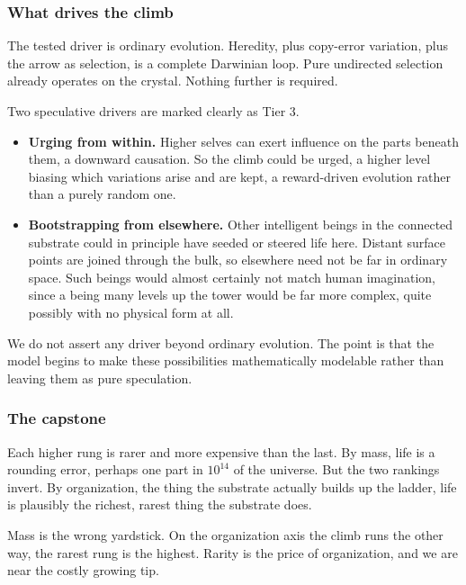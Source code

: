 \subsubsection{What drives the climb}

The tested driver is ordinary evolution. Heredity, plus copy-error variation, plus the arrow as selection, is a complete Darwinian loop. Pure undirected selection already operates on the crystal. Nothing further is required.

Two speculative drivers are marked clearly as Tier 3.

\begin{itemize}
\item \textbf{Urging from within.} Higher selves can exert influence on the parts beneath them, a downward causation. So the climb could be urged, a higher level biasing which variations arise and are kept, a reward-driven evolution rather than a purely random one.
\item \textbf{Bootstrapping from elsewhere.} Other intelligent beings in the connected substrate could in principle have seeded or steered life here. Distant surface points are joined through the bulk, so elsewhere need not be far in ordinary space. Such beings would almost certainly not match human imagination, since a being many levels up the tower would be far more complex, quite possibly with no physical form at all.
\end{itemize}

We do not assert any driver beyond ordinary evolution. The point is that the model begins to make these possibilities mathematically modelable rather than leaving them as pure speculation.

\subsubsection{The capstone}

Each higher rung is rarer and more expensive than the last. By mass, life is a rounding error, perhaps one part in $10^{14}$ of the universe. But the two rankings invert. By organization, the thing the substrate actually builds up the ladder, life is plausibly the richest, rarest thing the substrate does.

\begin{principle}
Mass is the wrong yardstick. On the organization axis the climb runs the other way, the rarest rung is the highest. Rarity is the price of organization, and we are near the costly growing tip.
\end{principle}

